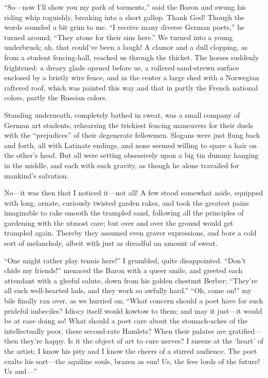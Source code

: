 \documentclass[12pt,a4paper]{article}
\begin{document}
“So—now I’ll show you my park of torments,” said the Baron and swung his riding whip roguishly, breaking into a short gallop. Thank God! Though the words sounded a bit grim to me. “I receive many diverse German poets,” he turned around; “They atone for their sins here.” We turned into a young underbrush; ah, that could’ve been a laugh! A clamor and a dull clopping, as from a student fencing-hall, reached us through the thicket. The horses suddenly frightened: a dreary glade opened before us, a rollered sand-strewn surface enclosed by a bristly wire fence, and in the center a large shed with a Norwegian raftered roof, which was painted this way and that in partly the French national colors, partly the Russian colors.

Standing underneath, completely bathed in sweat, was a small company of German art students, rehearsing the trickiest fencing maneuvers for their duels with the “prejudices” of their degenerate fellowmen. Slogans were just flung back and forth, all with Latinate endings, and none seemed willing to spare a hair on the other’s head. But all were setting obsessively upon a big tin dummy hanging in the middle, and each with such gravity, as though he alone travailed for mankind’s salvation.

No—it was then that I noticed it—not all! A few stood somewhat aside, equipped with long, ornate, curiously twisted garden rakes, and took the greatest pains imaginable to rake smooth the trampled sand, following all the principles of gardening with the utmost care; but over and over the ground would get trampled again. Thereby they assumed even graver expressions, and bore a cold sort of melancholy, albeit with just as dreadful an amount of sweat.

“One might rather play tennis here!” I grumbled, quite disappointed. “Don’t chide my friends!” menaced the Baron with a queer smile, and greeted each attendant with a gleeful salute, down from his golden chestnut Berber; “They’re all such well-hearted lads, and they work so awfully hard.” “Oh, come on!” my bile finally ran over, as we hurried on; “What concern should a poet have for such prideful imbeciles? Idiocy itself would kowtow to them; and may it just—it would be at ease doing so! What should a poet care about the stomach-aches of the intellectually poor, these second-rate Hamlets? When their palates are gratified—then they’re happy. Is it the object of art to cure nerves? I sneeze at the ‘heart’ of the artist; I know his pity and I know the cheers of a stirred audience. The poet exalts his sort—the aquiline souls, brazen as sun! Us, the free lords of the future! Us and—”
\end{document}
